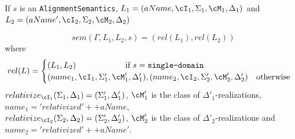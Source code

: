 \documentclass[10pt, a4paper]{isov2}
\newcommand*{\syntax}[1]{\texttt{#1}}
\begin{document}
If $s$ is an \syntax{AlignmentSemantics},
$L_1 = (aName, \cI_1,\Sigma_1,\cM_1,\Delta_1)$
and
$L_2 = (aName', \cI_2,\Sigma_2,\cM_2,\Delta_2)$

$$sem(\Gamma, L_1, L_2, s) = (rel(L_1), rel(L_2))$$
\noindent where $$ rel(L) = \begin{cases}
                                   (L_1,L_2)  \mbox{\qquad\qquad\qquad  if } s = \syntax{single-domain}\\
                                   (name_1,\cI_1,\Sigma'_1,\cM'_1,\Delta'_1),
                                   (name_2,\cI_2,\Sigma'_2,\cM'_2,\Delta'_2) \mbox{\quad otherwise}
                                                                                                                  \end{cases}$$
                                                                                                                  \noindent
$relativize_{\cI_1}(\Sigma_1,\Delta_1) = (\Sigma'_1,\Delta'_1)$,
$\cM'_1$ is the class of $\Delta'_1$-realizations,
$name_1 = 'relativized' ++ aName$,\\
$relativize_{\cI_2}(\Sigma_2,\Delta_2) = (\Sigma'_2,\Delta'_2)$,
$\cM'_2$ is the class of $\Delta'_2$-realizations and
$name_2 = 'relativized'++aName'$.
\end{document}
